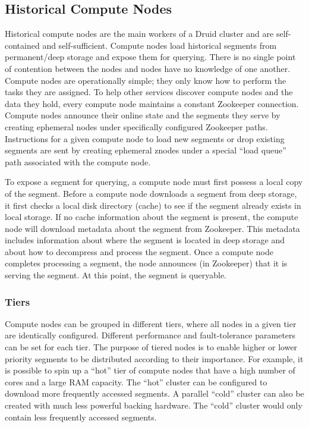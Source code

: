 \documentclass{vldb}
\begin{document}
\subsection{Historical Compute Nodes}
Historical compute nodes are the main workers of a Druid cluster and
are self-contained and self-sufficient. Compute nodes load historical
segments from permanent/deep storage and expose them for
querying. There is no single point of contention between the nodes and
nodes have no knowledge of one another. Compute nodes are
operationally simple; they only know how to perform the tasks they are
assigned. To help other services discover compute nodes and the data
they hold, every compute node maintains a constant Zookeeper
connection. Compute nodes announce their online state and the segments
they serve by creating ephemeral nodes under specifically configured
Zookeeper paths. Instructions for a given compute node to load new
segments or drop existing segments are sent by creating ephemeral
znodes under a special “load queue” path associated with the compute
node.

To expose a segment for querying, a compute node must first possess a
local copy of the segment. Before a compute node downloads a segment
from deep storage, it first checks a local disk directory (cache) to
see if the segment already exists in local storage. If no cache
information about the segment is present, the compute node will
download metadata about the segment from Zookeeper. This metadata
includes information about where the segment is located in deep
storage and about how to decompress and process the segment. Once a
compute node completes processing a segment, the node announces (in
Zookeeper) that it is serving the segment. At this point, the segment
is queryable.

\subsubsection{Tiers}
\label{sec:tiers}
Compute nodes can be grouped in different tiers, where all nodes in a
given tier are identically configured. Different performance and
fault-tolerance parameters can be set for each tier. The purpose of
tiered nodes is to enable higher or lower priority segments to be
distributed according to their importance. For example, it is possible
to spin up a “hot” tier of compute nodes that have a high number of
cores and a large RAM capacity. The “hot” cluster can be configured to
download more frequently accessed segments. A parallel “cold” cluster
can also be created with much less powerful backing hardware. The
“cold” cluster would only contain less frequently accessed segments.
\end{document}
